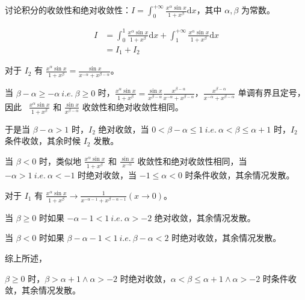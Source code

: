 \begin{ques}
	讨论积分的收敛性和绝对收敛性：$\displaystyle I=\int _{0}^{+\infty }\frac{x^{\alpha }\sin x}{1+x^{\beta }}\mathrm{d} x$，其中 $\displaystyle \alpha ,\beta $ 为常数。
\end{ques}


\begin{align*}
	I & =\int _{0}^{1}\frac{x^{\alpha }\sin x}{1+x^{\beta }}\mathrm{d} x+\int _{1}^{+\infty }\frac{x^{\alpha }\sin x}{1+x^{\beta }}\mathrm{d} x\\
	& =I_{1} +I_{2}
\end{align*}


对于 $\displaystyle I_{2}$ 有 $\displaystyle \frac{x^{\alpha }\sin x}{1+x^{\beta }} =\frac{\sin x}{x^{-\alpha } +x^{\beta -\alpha }}$。

当 $\displaystyle \beta -\alpha \geqslant -\alpha \ i.e.\ \beta \geqslant 0$ 时，$\displaystyle \frac{x^{\alpha }\sin x}{1+x^{\beta }} =\frac{\sin x}{x^{\beta -\alpha }}\frac{x^{\beta -\alpha }}{x^{-\alpha } +x^{\beta -\alpha }}$，$\displaystyle \frac{x^{\beta -\alpha }}{x^{-\alpha } +x^{\beta -\alpha }}$ 单调有界且定号，因此 \ $\displaystyle \frac{x^{\alpha }\sin x}{1+x^{\beta }}$ 和 $\displaystyle \frac{\sin x}{x^{\beta -\alpha }}$ 收敛性和绝对收敛性相同。

于是当 $\displaystyle \beta -\alpha  >1$ 时，$\displaystyle I_{2}$ 绝对收敛，当 $\displaystyle 0< \beta -\alpha \leqslant 1\ i.e.\ \alpha < \beta \leqslant \alpha +1$ 时，$\displaystyle I_{2}$ 条件收敛，其余时候 $\displaystyle I_{2}$ 发散。

当 $\displaystyle \beta < 0$ 时，类似地 $\displaystyle \frac{x^{\alpha }\sin x}{1+x^{\beta }}$ 和 $\displaystyle \frac{\sin x}{x^{-\alpha }}$ 收敛性和绝对收敛性相同，当 $\displaystyle -\alpha  >1\ i.e.\ \alpha < -1$ 时绝对收敛，当 $\displaystyle -1\leqslant \alpha < 0$ 时条件收敛，其余情况发散。



对于 $\displaystyle I_{1}$ 有 $\displaystyle \frac{x^{\alpha }\sin x}{1+x^{\beta }}\rightarrow \frac{1}{x^{-\alpha -1} +x^{\beta -\alpha -1}}\left( x\rightarrow 0\right)$。

当 $\displaystyle \beta \geqslant 0$ 时如果 $\displaystyle -\alpha -1< 1\ i.e.\ \alpha  >-2$ 绝对收敛，其余情况发散。

当 $\displaystyle \beta < 0$ 时如果 $\displaystyle \beta -\alpha -1< 1\ i.e.\ \beta -\alpha < 2$ 时绝对收敛，其余情况发散。

综上所述，

$\displaystyle \beta \geqslant 0$ 时，$\displaystyle \beta  >\alpha +1\land \alpha  >-2$ 时绝对收敛，$\displaystyle \alpha < \beta \leqslant \alpha +1\land \alpha  >-2$ 时条件收敛，其余情况发散。

